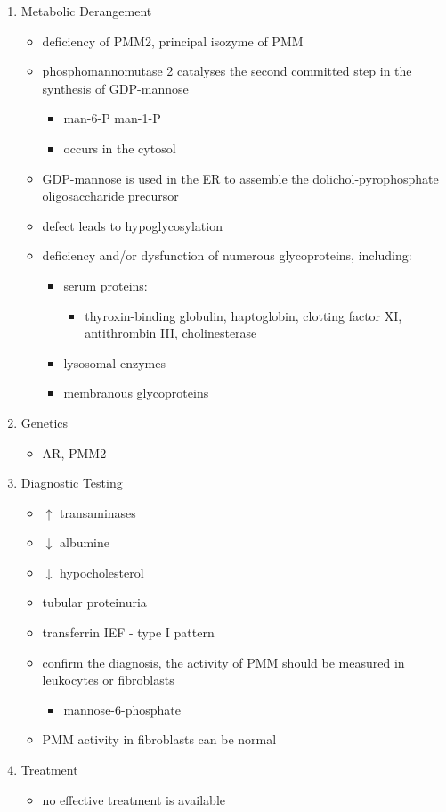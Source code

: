 \documentclass{scrartcl}
\begin{document}
\begin{enumerate}
\item Metabolic Derangement
\label{sec:org959f88a}
\begin{itemize}
\item deficiency of PMM2, principal isozyme of PMM
\item phosphomannomutase 2 catalyses the second committed step in the synthesis of GDP-mannose
\begin{itemize}
\item man-6-P \ce{<=>} man-1-P
\item occurs in the cytosol
\end{itemize}
\item GDP-mannose is used in the ER to assemble the dolichol-pyrophosphate
oligosaccharide precursor
\item defect leads to hypoglycosylation
\item deficiency and/or dysfunction of numerous glycoproteins, including:
\begin{itemize}
\item serum proteins:
\begin{itemize}
\item thyroxin-binding globulin, haptoglobin, clotting factor XI,
antithrombin III, cholinesterase
\end{itemize}
\item lysosomal enzymes
\item membranous glycoproteins
\end{itemize}
\end{itemize}

\item Genetics
\label{sec:org0a64e66}
\begin{itemize}
\item AR, PMM2
\end{itemize}

\item Diagnostic Testing
\label{sec:orgf36c174}
\begin{itemize}
\item \(\uparrow\) transaminases
\item \(\downarrow\) albumine
\item \(\downarrow\) hypocholesterol
\item tubular proteinuria
\item transferrin IEF - type I pattern
\item confirm the diagnosis, the activity of PMM should be measured in
leukocytes or fibroblasts
\begin{itemize}
\item\relax [2-H\(^{\text{3}}\)]mannose-6-phosphate
\end{itemize}
\item PMM activity in fibroblasts can be normal
\end{itemize}

\item Treatment
\label{sec:orgfcb2db9}
\begin{itemize}
\item no effective treatment is available
\end{itemize}
\end{enumerate}
\end{document}
